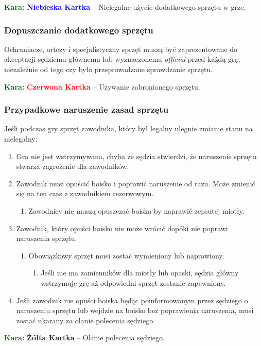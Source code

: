 \documentclass[11pt,a4paper]{article}
\newcommand\redcard[1]{\bgroup\textcolor{darkgreen}{\textbf{Kara: }}\bgroup\textcolor{red}{\textbf{Czerwona Kartka}} -- #1}
\newcommand\yellowcard[1]{\bgroup\textcolor{darkgreen}{\textbf{Kara: }}\bgroup\textcolor{darkyellow}{\textbf{Żółta Kartka}} -- #1}
\newcommand\bluecard[1]{\bgroup\textcolor{darkgreen}{\textbf{Kara: }}\bgroup\textcolor{blue}{\textbf{Niebieska Kartka}} -- #1}
\begin{document}
\bluecard{Nielegalne użycie dodatkowego sprzętu w grze.}

\subsubsection{Dopuszczanie dodatkowego sprzętu}
Ochraniacze, ortezy i specjalistyczny sprzęt muszą być zaprezentowane do akceptacji sędziemu głównemu lub wyznaczonemu \emph{official} przed każdą grą, niezależnie od tego czy było przeprowadzane sprawdzanie sprzętu.

\redcard{Używanie zabronionego sprzętu.}

\subsubsection{Przypadkowe naruszenie zasad sprzętu}
Jeśli podczas gry sprzęt zawodnika, który był legalny ulegnie zmianie stanu na nielegalny:
\begin{enumerate}
  \item Gra nie jest wstrzymywana, chyba że sędzia stwierdzi, że naruszenie sprzętu stwarza zagrożenie dla zawodników.
  \item Zawodnik musi opuścić boisko i poprawić naruszenie od razu. Może zmienić się na ten czas z zawodnikiem rezerwowym.
  \begin{enumerate}
    \item Zawodnicy nie muszą opuszczać boiska by naprawić zepsutej miotły.
  \end{enumerate}
  \item Zawodnik, który opuści boisko nie może wrócić dopóki nie poprawi naruszenia sprzętu.
  \begin{enumerate}
    \item Obowiązkowy sprzęt musi zostać wymieniony lub naprawiony.
    \begin{enumerate}
      \item Jeśli nie ma zamienników dla miotły lub opaski, sędzia główny wstrzymuje grę aż odpowiedni sprzęt zostanie zapewniony.
    \end{enumerate}
  \end{enumerate}
  \item Jeśli zawodnik nie opuści boiska będąc poinformowanym przez sędziego o naruszeniu sprzętu lub wejdzie na boisko bez poprawienia naruszenia, musi zostać ukarany za olanie polecenia sędziego.
\end{enumerate}

\yellowcard{Olanie polecenia sędziego.}
\end{document}
